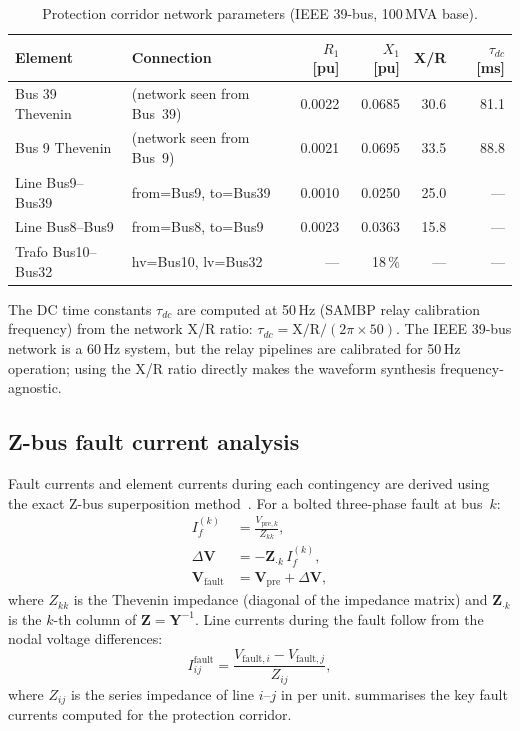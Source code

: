 \documentclass[12pt,a4paper]{article}
\begin{document}
\begin{table}[H]
\centering
\caption{Protection corridor network parameters (IEEE 39-bus, 100\,MVA base).}
\label{tab:network}
\setlength{\tabcolsep}{6pt}
\begin{tabular}{llrrrr}
\toprule
Element & Connection & $R_1$ [pu] & $X_1$ [pu] & X/R & $\tau_{dc}$ [ms] \\
\midrule
Bus 39 Thevenin & (network seen from Bus~39) & 0.0022 & 0.0685 & 30.6 & 81.1 \\
Bus 9 Thevenin  & (network seen from Bus~9)  & 0.0021 & 0.0695 & 33.5 & 88.8 \\
Line Bus9--Bus39 & from=Bus9, to=Bus39       & 0.0010 & 0.0250 & 25.0 & --- \\
Line Bus8--Bus9  & from=Bus8, to=Bus9        & 0.0023 & 0.0363 & 15.8 & --- \\
Trafo Bus10--Bus32 & hv=Bus10, lv=Bus32      & --- & 18\,\% & --- & --- \\
\bottomrule
\end{tabular}
\end{table}

The DC time constants $\tau_{dc}$ are computed at 50\,Hz (SAMBP relay
calibration frequency) from the network X/R ratio: $\tau_{dc} = \mathrm{X/R}
/ (2\pi \times 50)$.  The IEEE 39-bus network is a 60\,Hz system, but the
relay pipelines are calibrated for 50\,Hz operation; using the X/R ratio
directly makes the waveform synthesis frequency-agnostic.

\subsection{Z-bus fault current analysis}
\label{sec:zbus}

Fault currents and element currents during each contingency are derived using
the exact Z-bus superposition method~\citep{Anderson1999}.  For a bolted
three-phase fault at bus~$k$:
\begin{align}
  I_f^{(k)} &= \frac{V_{\mathrm{pre},k}}{Z_{kk}}, \label{eq:if} \\
  \Delta\bm{V} &= -\bm{Z}_{\cdot k}\, I_f^{(k)}, \\
  \bm{V}_{\mathrm{fault}} &= \bm{V}_{\mathrm{pre}} + \Delta\bm{V},
\end{align}
where $Z_{kk}$ is the Thevenin impedance (diagonal of the impedance matrix)
and $\bm{Z}_{\cdot k}$ is the $k$-th column of $\mathbf{Z} = \mathbf{Y}^{-1}$.
Line currents during the fault follow from the nodal voltage differences:
\begin{equation}
  I_{ij}^{\mathrm{fault}} = \frac{V_{\mathrm{fault},i} - V_{\mathrm{fault},j}}{Z_{ij}},
\end{equation}
where $Z_{ij}$ is the series impedance of line $i$--$j$ in per unit.
 summarises the key fault currents computed for
the protection corridor.
\end{document}

